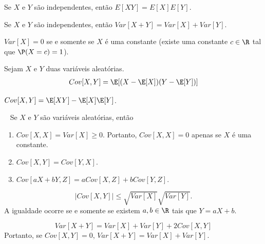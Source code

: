 \begin{lemma}
 \label{expectation_multiplication}
 Se $X$ e $Y$ são independentes, então $E[XY] = E[X]E[Y]$.
\end{lemma}
	
\begin{lemma}
 \label{variance_additivity}
 Se $X$ e $Y$ são independentes, então $Var[X+Y] = Var[X] + Var[Y]$.
\end{lemma}
	
\begin{lemma}
 \label{lemma:zeroVariance}
 $Var[X]=0$ se e somente se $X$ é uma constante
 (existe uma constante $c \in \R$ tal que $\P(X=c)=1$).
\end{lemma}
	
\begin{definition}[Covariância]
 Sejam $X$ e $Y$ duas variáveis aleatórias.
 \begin{align*}
  Cov[X,Y] = \E[(X-\E[X])(Y-\E[Y])]
 \end{align*}
\end{definition}

\begin{lemma} $Cov[X,Y] = \E[XY] - \E[X]\E[Y]$.
 \label{lemma:covariance_calculation}
\end{lemma}
	
\begin{lemma} \
 \label{lemma:covariance_properties}
 Se $X$ e $Y$ são variáveis aleatórias, então
 \begin{enumerate}[label=\alph*.]
  \item $Cov[X,X] = Var[X] \geq 0$. Portanto, $Cov[X,X] = 0$ apenas se $X$ é uma constante.
  \item $Cov[X,Y] = Cov[Y,X]$.
  \item $Cov[aX+bY,Z] = aCov[X,Z] + bCov[Y,Z]$.
 \end{enumerate}
\end{lemma}
	
\begin{lemma}
 \label{lemma:covariance_cauchy_schwarz}
 $$|Cov[X,Y]| \leq \sqrt{Var[X]}\sqrt{Var[Y]}.$$
 A igualdade ocorre se e somente se existem $a,b \in \R$ tais que $Y=aX+b$.
\end{lemma}
	
\begin{lemma}
 \label{lemma::pythagorean}
 $$Var[X+Y] = Var[X]+Var[Y]+2Cov[X,Y]$$
 Portanto, se $Cov[X,Y]=0$, $Var[X+Y]=Var[X]+Var[Y]$.
\end{lemma}
	
